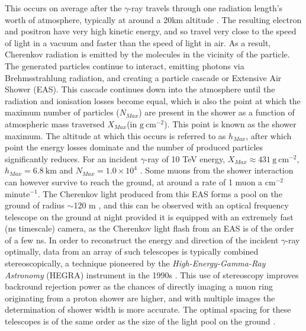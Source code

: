 This occurs on average after the $\gamma$-ray travels through one radiation length's worth of atmosphere, typically at around a 20km altitude \cite{weekesgamma}. The resulting electron and positron have very high kinetic energy, and so travel very close to the speed of light in a vacuum and faster than the speed of light in air. As a result, Cherenkov radiation is emitted by the molecules in the vicinity of the particle.
The generated particles continue to interact, emitting photons via Brehmsstrahlung radiation, and creating a particle cascade or Extensive Air Shower (EAS). This cascade continues down into the atmosphere until the radiation and ionisation losses become equal, which is also the point at which the maximum number of particles ($N_{Max}$) are present in the shower as a function of atmospheric mass traversed $X_{Max}$(in $\mathrm{g\ cm^{-2}}$). This point is known as the shower maximum. The altitude at which this occurs is referred to as $h_{Max}$, after which point the energy losses dominate and the number of produced particles significantly reduces. For an incident $\gamma$-ray of 10 TeV energy, $X_{Max}\approx 431 \mathrm{\ g\ cm^{-2}}$, $h_{Max}=6.8\ \mathrm{km}$ and $N_{Max}=1.0 \times 10^4$ \cite{weekesgamma}. Some muons from the shower interaction can however survive to reach the ground, at around a rate of 1 muon a $\mathrm{cm^{-2}}$ minute$^{-1}$. The Cherenkov light produced from this EAS forms a pool on the ground of radius $\sim$120 m \cite{weekesgamma}, and this can be observed with an optical frequency telescope on the ground at night provided it is equipped with an extremely fast (ns timescale) camera, as the Cherenkov light flash from an EAS is of the order of a few ns. In order to reconstruct the energy and direction of the incident $\gamma$-ray optimally, data from an array of such telescopes is typically combined stereoscopically, a technique pioneered by the \textit{High-Energy-Gamma-Ray Astronomy} (HEGRA) instrument in the 1990s \cite{HEGRA}. This use of stereoscopy improves backround rejection power as the chances of directly imaging a muon ring originating from a proton shower are higher, and with multiple images the determination of shower width is more accurate.  The optimal spacing for these telescopes is of the same order as the size of the light pool on the ground \cite{weekesgamma}.

